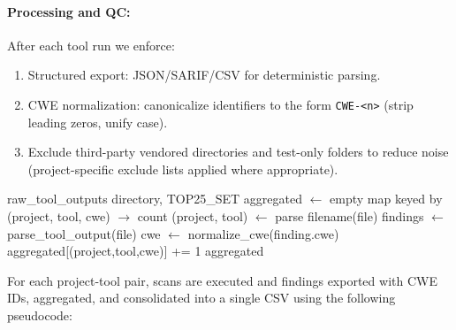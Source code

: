 \paragraph{Processing and QC:}
After each tool run we enforce:
\begin{enumerate}
  \item Structured export: JSON/SARIF/CSV for deterministic parsing.
  \item CWE normalization: canonicalize identifiers to the form \texttt{CWE-<n>} (strip leading zeros, unify case).
  \item Exclude third-party vendored directories and test-only folders to reduce noise (project-specific exclude lists applied where appropriate).
\end{enumerate}


\begin{algorithm}[H]
\caption{Parse and normalize tool outputs}
\begin{algorithmic}[1]
\REQUIRE raw\_tool\_outputs directory, TOP25\_SET
\STATE aggregated $\leftarrow$ empty map keyed by (project, tool, cwe) $\to$ count
  \STATE (project, tool) $\leftarrow$ parse filename(file)
  \STATE findings $\leftarrow$ parse\_tool\_output(file) 
    \STATE cwe $\leftarrow$ normalize\_cwe(finding.cwe) 
      \STATE aggregated[(project,tool,cwe)] += 1
    \ENDIF
  \ENDFOR
\ENDFOR
\RETURN aggregated
\end{algorithmic}
\end{algorithm}

For each project-tool pair, scans are executed and findings exported with CWE IDs, aggregated, and consolidated into a single CSV using the following pseudocode: 

